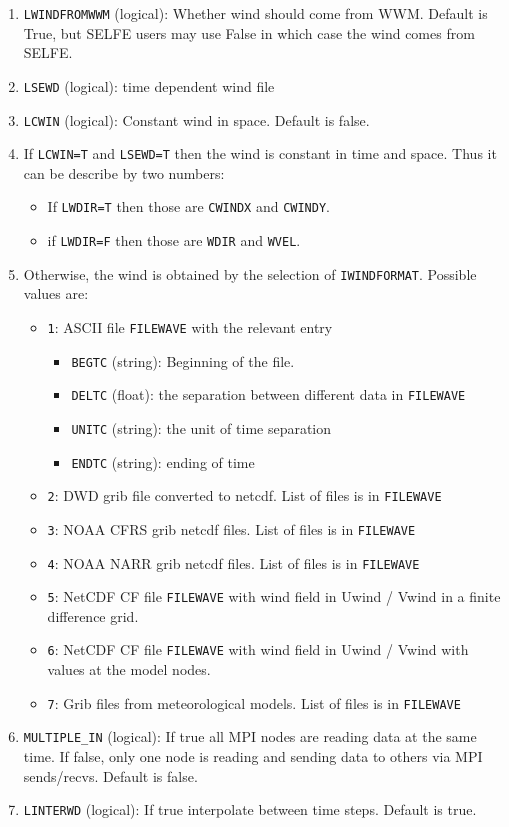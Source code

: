 \documentclass[12pt]{amsart}
\begin{document}
\begin{enumerate}
\item {\tt LWINDFROMWWM} (logical): Whether wind should come from WWM. Default is True, but SELFE users may use False in which case the wind comes from SELFE.
\item {\tt LSEWD} (logical): time dependent wind file
\item {\tt LCWIN} (logical): Constant wind in space. Default is false.
\item If {\tt LCWIN=T} and {\tt LSEWD=T} then the wind is constant in time and space. Thus it can be describe by two numbers:
  \begin{itemize}
  \item If {\tt LWDIR=T} then those are {\tt CWINDX} and {\tt CWINDY}.
  \item if {\tt LWDIR=F} then those are {\tt WDIR} and {\tt WVEL}.
  \end{itemize}
\item Otherwise, the wind is obtained by the selection of {\tt IWINDFORMAT}. Possible values are:
  \begin{itemize}
  \item {\tt 1}: ASCII file {\tt FILEWAVE} with the relevant entry
    \begin{itemize}
    \item {\tt BEGTC} (string): Beginning of the file.
    \item {\tt DELTC} (float): the separation between different data in {\tt FILEWAVE}
    \item {\tt UNITC} (string): the unit of time separation
    \item {\tt ENDTC} (string): ending of time 
    \end{itemize}
  \item {\tt 2}: DWD grib file converted to netcdf. List of files is in {\tt FILEWAVE}
  \item {\tt 3}: NOAA CFRS grib netcdf files. List of files is in {\tt FILEWAVE}
  \item {\tt 4}: NOAA NARR grib netcdf files. List of files is in {\tt FILEWAVE}
  \item {\tt 5}: NetCDF CF file {\tt FILEWAVE} with wind field in Uwind / Vwind in a finite difference grid.
  \item {\tt 6}: NetCDF CF file {\tt FILEWAVE} with wind field in Uwind / Vwind with values at the model nodes.
  \item {\tt 7}: Grib files from meteorological models. List of files is in {\tt FILEWAVE}
  \end{itemize}
\item {\tt MULTIPLE\_IN} (logical): If true all MPI nodes are reading data at the same time. If false, only one node is reading and sending data to others via MPI sends/recvs. Default is false.
\item {\tt LINTERWD} (logical): If true interpolate between time steps. Default is true.
\end{enumerate}
\end{document}
